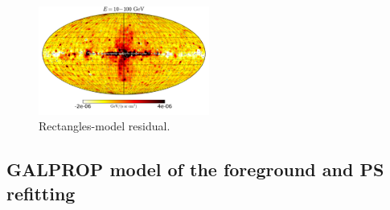 \begin{figure}[h]
 \includegraphics[width=0.5\textwidth]{plots/Mollweide_Boxes_residual+boxes_03-10GeV_flux_source_range_1.pdf}
 \caption{Rectangles-model residual.}
 \label{fig:Maps_Rectangles}
\end{figure}
%
%

\subsection{GALPROP model of the foreground and PS refitting}
\label{sec:galprop_model}


